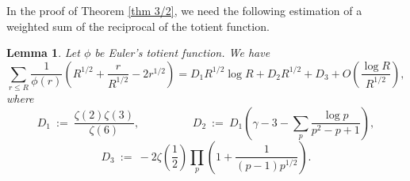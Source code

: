 \documentclass[12pt,reqno]{amsart}
\numberwithin{equation}{section}
\theoremstyle{plain}
\newtheorem{lemma}[thm]{Lemma}
\begin{document}
In the proof of Theorem \ref{thm 3/2}, we need the following estimation of a weighted sum of the reciprocal of the totient function.
\begin{lemma}
\label{sum reciprocal totient lemma}
Let $\phi$ be Euler's totient function. We have
\begin{equation}  \sum_{r\leq R} \frac 1{\phi(r)}\left( R^{1/2} + \frac r{R^{1/2}} -2r^{1/2} \right)=D_1R^{1/2} \log R + D_2 R^{1/2} + D_3 + O\left(\frac{\log R}{R^{1/2}}\right),
\label{sum reciprocal totient equation}
\end{equation}
where
$$ D_1 \ :=\  \frac{\zeta(2)\zeta(3)}{\zeta(6)}, \hspace{2cm}  D_2\ :=\ D_1 \left( \gamma-3-\sum_p \frac{\log p}{p^2-p+1} \right), $$
\begin{equation} D_3\ :=\ -2 \zeta\left(\frac 12\right)\prod_p \left(1+\frac 1{(p-1)p^{1/2}} \right).\end{equation}


\end{lemma}
\end{document}
